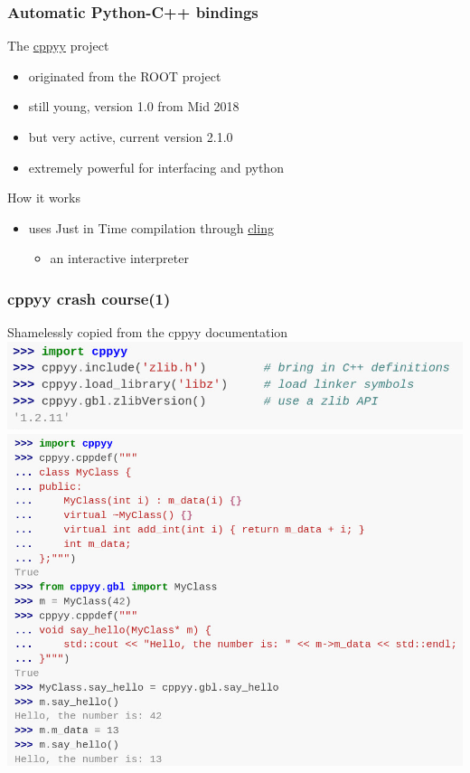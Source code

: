 \begin{frame}
  \frametitle{Automatic Python-C++ bindings}
  \begin{block}{The {\color{blue!50!white} \href{https://cppyy.readthedocs.io}{cppyy}} project}
    \begin{itemize}
    \item originated from the ROOT project
    \item still young, version 1.0 from Mid 2018
    \item but very active,  current version 2.1.0
    \item extremely powerful for interfacing \cpp and python
    \end{itemize}
  \end{block}
  \begin{block}{How it works}
    \begin{itemize}
    \item uses Just in Time compilation through {\color{blue!50!black} \href{https://github.com/vgvassilev/cling}{cling}}
      \begin{itemize}
      \item an interactive \cpp interpreter
      \end{itemize}
    \end{itemize}
  \end{block}
\end{frame}

\begin{frame}
  \frametitle{cppyy crash course(1)}
  Shamelessly copied from the cppyy documentation
  \includegraphics[width=.8\textwidth]{cppyy2.png}
  \includegraphics[trim={0 3.2cm 0 0},clip,width=\textwidth]{cppyy.png}
\end{frame}

